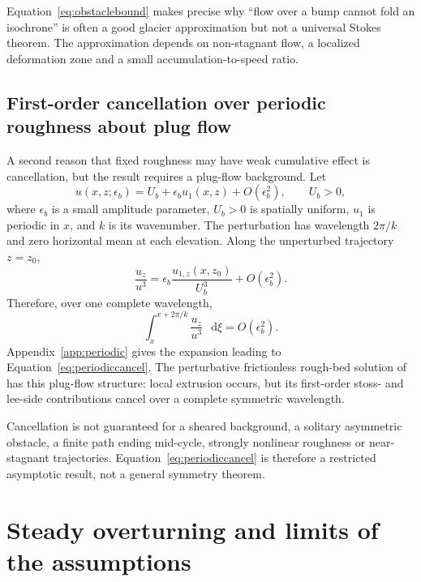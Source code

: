\documentclass[review]{igs}
\newcommand{\textcite}{\citet}
\theoremstyle{definition}
\theoremstyle{remark}
\newcommand{\dd}{\mathop{}\!\mathrm{d}}
\begin{document}
Equation~\eqref{eq:obstaclebound} makes precise why ``flow over a bump cannot fold an isochrone'' is often a good glacier approximation but not a universal Stokes theorem. The approximation depends on non-stagnant flow, a localized deformation zone and a small accumulation-to-speed ratio.

\subsection{First-order cancellation over periodic roughness about plug flow}

A second reason that fixed roughness may have weak cumulative effect is cancellation, but the result requires a plug-flow background. Let
\begin{equation}
 u(x,z;\epsilon_b)=U_b+\epsilon_b u_1(x,z)+O(\epsilon_b^2),
 \qquad U_b>0,
\label{eq:plugperturbation}
\end{equation}
where \(\epsilon_b\) is a small amplitude parameter, \(U_b>0\) is spatially uniform, \(u_1\) is periodic in \(x\), and \(k\) is its wavenumber. The perturbation has wavelength \(2\pi/k\) and zero horizontal mean at each elevation. Along the unperturbed trajectory \(z=z_0\),
\begin{equation}
\frac{u_z}{u^3}
=\epsilon_b\frac{u_{1,z}(x,z_0)}{U_b^3}+O(\epsilon_b^2).
\label{eq:periodicshear}
\end{equation}
Therefore, over one complete wavelength,
\begin{equation}
\int_{x}^{x+2\pi/k}\frac{u_z}{u^3}\,\dd\xi=O(\epsilon_b^2).
\label{eq:periodiccancel}
\end{equation}
Appendix~\ref{app:periodic} gives the expansion leading to Equation~\eqref{eq:periodiccancel}. The perturbative frictionless rough-bed solution of \textcite{Gudmundsson1997linear} has this plug-flow structure: local extrusion occurs, but its first-order stoss- and lee-side contributions cancel over a complete symmetric wavelength.

Cancellation is not guaranteed for a sheared background, a solitary asymmetric obstacle, a finite path ending mid-cycle, strongly nonlinear roughness or near-stagnant trajectories. Equation~\eqref{eq:periodiccancel} is therefore a restricted asymptotic result, not a general symmetry theorem.

\section{Steady overturning and limits of the assumptions}
\end{document}
